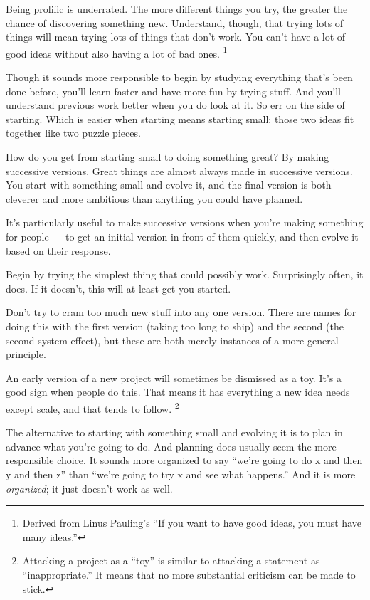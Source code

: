 \documentclass[12pt]{book}
\begin{document}
Being prolific is underrated. The more different things you try, the
greater the chance of discovering something new. Understand, though,
that trying lots of things will mean trying lots of things that don't
work. You can't have a lot of good ideas without also having a lot of
bad ones. \footnote{Derived from Linus Pauling's ``If you want to have good ideas,
you must have many ideas.''}

Though it sounds more responsible to begin by studying everything that's
been done before, you'll learn faster and have more fun by trying stuff.
And you'll understand previous work better when you do look at it. So
err on the side of starting. Which is easier when starting means
starting small; those two ideas fit together like two puzzle pieces.

How do you get from starting small to doing something great? By making
successive versions. Great things are almost always made in successive
versions. You start with something small and evolve it, and the final
version is both cleverer and more ambitious than anything you could have
planned.

It's particularly useful to make successive versions when you're making
something for people --- to get an initial version in front of them
quickly, and then evolve it based on their response.

Begin by trying the simplest thing that could possibly work.
Surprisingly often, it does. If it doesn't, this will at least get you
started.

Don't try to cram too much new stuff into any one version. There are
names for doing this with the first version (taking too long to ship)
and the second (the second system effect), but these are both merely
instances of a more general principle.

An early version of a new project will sometimes be dismissed as a toy.
It's a good sign when people do this. That means it has everything a new
idea needs except scale, and that tends to follow.
\footnote{Attacking a project as a ``toy'' is similar to attacking a
statement as ``inappropriate.'' It means that no more substantial
criticism can be made to stick.}

The alternative to starting with something small and evolving it is to
plan in advance what you're going to do. And planning does usually seem
the more responsible choice. It sounds more organized to say ``we're
going to do x and then y and then z'' than ``we're going to try x and
see what happens.'' And it is more \emph{organized}; it just doesn't
work as well.
\end{document}
